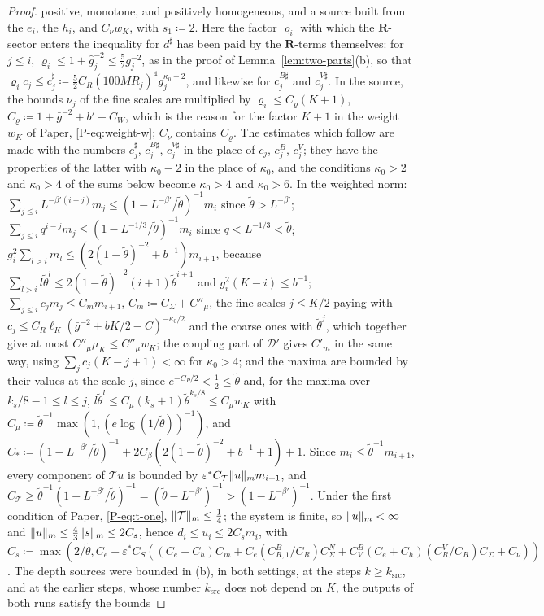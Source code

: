 \documentclass[11pt]{preprint}
\DeclarePairedDelimiter{\norm}{\lVert}{\rVert}
\numberwithin{equation}{section}
\theoremstyle{definition}
\theoremstyle{remark}
\theoremstyle{plain}
\begin{document}
\begin{proof}
positive, monotone, and positively homogeneous, and a source built from the $e_i$, the $h_i$, and $C_\nu w_K$, with $s_1 \coloneqq 2$. Here the factor $\varrho_i$ with which the $\mathbf R$-sector enters the inequality for $d^\sharp$ has been paid by the $\mathbf R$-terms themselves: for $j \leq i$, $\varrho_i \leq 1 + \hat g_j^{-2} \leq \frac52g_j^{-2}$, as in the proof of Lemma~\ref{lem:two-parts}(b), so that $\varrho_ic_j \leq c^\sharp_j \coloneqq \frac52C_R(100MR_j)^4g_j^{\kappa_0-2}$, and likewise for $c^{B\sharp}_j$ and $c^{V\sharp}_j$. In the source, the bounds $\nu_j$ of the fine scales are multiplied by $\varrho_i \leq C_\varrho(K + 1)$, $C_\varrho \coloneqq 1 + \bar g^{-2} + b' + C_W$, which is the reason for the factor $K + 1$ in the weight $w_K$ of Paper, \eqref{P-eq:weight-w}; $C_\nu$ contains $C_\varrho$. The estimates which follow are made with the numbers $c^\sharp_j$, $c^{B\sharp}_j$, $c^{V\sharp}_j$ in the place of $c_j$, $c^B_j$, $c^V_j$; they have the properties of the latter with $\kappa_0 - 2$ in the place of $\kappa_0$, and the conditions $\kappa_0 > 2$ and $\kappa_0 > 4$ of the sums below become $\kappa_0 > 4$ and $\kappa_0 > 6$. In the weighted norm: $\sum_{j \leq i}L^{-\beta'(i-j)}m_j \leq (1 - L^{-\beta'}/\tilde\theta)^{-1}m_i$ since $\tilde\theta > L^{-\beta'}$; $\sum_{j \leq i}q^{i-j}m_j \leq (1 - L^{-1/3}/\tilde\theta)^{-1}m_i$ since $q < L^{-1/3} < \tilde\theta$; $g_i^2\sum_{l>i}m_l \leq (2(1 - \tilde\theta)^{-2} + b^{-1})m_{i+1}$, because $\sum_{l>i}l\tilde\theta^l \leq 2(1 - \tilde\theta)^{-2}(i + 1)\tilde\theta^{i+1}$ and $g_i^2(K - i) \leq b^{-1}$; $\sum_{j \leq i}c_jm_j \leq C_mm_{i+1}$, $C_m \coloneqq C_\Sigma + C''_\mu$, the fine scales $j \leq K/2$ paying with $c_j \leq C_R\ell_K(\bar g^{-2} + bK/2 - C)^{-\kappa_0/2}$ and the coarse ones with $\tilde\theta^j$, which together give at most $C''_\mu\mu_K \leq C''_\mu w_K$; the coupling part of $\mathcal D'$ gives $C'_m$ in the same way, using $\sum_jc_j(K - j + 1) < \infty$ for $\kappa_0 > 4$; and the maxima are bounded by their values at the scale $j$, since $e^{-C_P/2} < \frac12 \leq \tilde\theta$ and, for the maxima over $k_s/8 - 1 \leq l \leq j$, $l\tilde\theta^l \leq C_\mu(k_s + 1)\tilde\theta^{k_s/8} \leq C_\mu w_K$ with $C_\mu \coloneqq \tilde\theta^{-1}\max(1, (e\log(1/\tilde\theta))^{-1})$, and $C_* \coloneqq (1 - L^{-\beta'}/\tilde\theta)^{-1} + 2C_\beta(2(1 - \tilde\theta)^{-2} + b^{-1} + 1) + 1$. Since $m_i \leq \tilde\theta^{-1}m_{i+1}$, every component of $\mathcal Tu$ is bounded by $\varepsilon^*C_{\mathcal T}\norm u_mm_{i+1}$, and $C_{\mathcal T} \geq \tilde\theta^{-1}(1 - L^{-\beta'}/\tilde\theta)^{-1} = (\tilde\theta - L^{-\beta'})^{-1} > (1 - L^{-\beta'})^{-1}$. Under the first condition of Paper, \eqref{P-eq:t-one}, $\norm{\mathcal T}_m \leq \frac14$; the system is finite, so $\norm u_m < \infty$ and $\norm u_m \leq \frac43\norm s_m \leq 2C_s$, hence $d_i \leq u_i \leq 2C_sm_i$, with $C_s \coloneqq \max(2/\tilde\theta, C_e + \varepsilon^*C_S((C_e + C_h)C_m + C_e(C^B_{R,1}/C_R)C^N_\Sigma + C^B_V(C_e + C_h)(C^V_R/C_R)C_\Sigma + C_\nu))$. The depth sources were bounded in (b), in both settings, at the steps $k \geq k_{\mathrm{src}}$, and at the earlier steps, whose number $k_{\mathrm{src}}$ does not depend on $K$, the outputs of both runs satisfy the bounds 
\end{proof}
\end{document}
